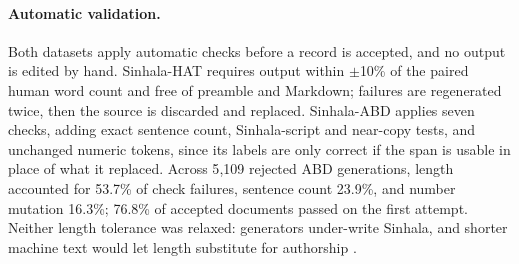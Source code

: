 \paragraph{Automatic validation.}
Both datasets apply automatic checks before a record is accepted, and no output
is edited by hand. Sinhala-HAT requires output within $\pm$10\% of the paired
human word count and free of preamble and Markdown; failures are regenerated
twice, then the source is discarded and replaced. Sinhala-ABD applies seven
checks, adding exact sentence count, Sinhala-script and near-copy tests, and
unchanged numeric tokens, since its labels are only correct if the span is
usable in place of what it replaced. Across 5{,}109 rejected ABD generations,
length accounted for 53.7\% of check failures, sentence count 23.9\%, and
number mutation 16.3\%; 76.8\% of accepted documents passed on the first
attempt. Neither length tolerance was relaxed: generators under-write Sinhala,
and shorter machine text would let length substitute for authorship
\citep{doughman2024limitations}.
